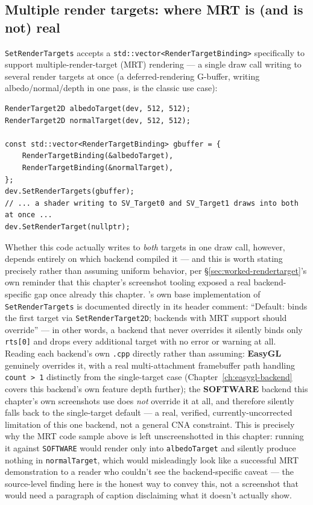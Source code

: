 \subsection{Multiple render targets: where MRT is (and is not) real}
\label{sec:worked-mrt}

\texttt{SetRenderTargets} accepts a \texttt{std::vector<RenderTargetBinding>} specifically to
support multiple-render-target (MRT) rendering --- a single draw call writing to several
render targets at once (a deferred-rendering G-buffer, writing albedo/normal/depth in one
pass, is the classic use case):

\begin{lstlisting}
RenderTarget2D albedoTarget(dev, 512, 512);
RenderTarget2D normalTarget(dev, 512, 512);

const std::vector<RenderTargetBinding> gbuffer = {
    RenderTargetBinding(&albedoTarget),
    RenderTargetBinding(&normalTarget),
};
dev.SetRenderTargets(gbuffer);
// ... a shader writing to SV_Target0 and SV_Target1 draws into both at once ...
dev.SetRenderTarget(nullptr);
\end{lstlisting}

Whether this code actually writes to \emph{both} targets in one draw call, however, depends
entirely on which backend compiled it --- and this is worth stating precisely rather than
assuming uniform behavior, per \S\ref{sec:worked-rendertarget}'s own reminder that this
chapter's screenshot tooling exposed a real backend-specific gap once already this chapter.
's own base implementation of \texttt{SetRenderTargets} is
documented directly in its header comment: ``Default: binds the first target via
\texttt{SetRenderTarget2D}; backends with MRT support should override'' --- in other words,
a backend that never overrides it silently binds only \texttt{rts[0]} and drops every
additional target with no error or warning at all. Reading each backend's own
\texttt{.cpp} directly rather than assuming: \textbf{EasyGL} genuinely overrides it, with a
real multi-attachment framebuffer path handling \texttt{count > 1} distinctly from the
single-target case (Chapter~\ref{ch:easygl-backend} covers this backend's own feature depth
further); the \textbf{SOFTWARE} backend this chapter's own screenshots use does
\emph{not} override it at all, and therefore silently falls back to the single-target default
--- a real, verified, currently-uncorrected limitation of this one backend, not a general CNA
constraint. This is precisely why the MRT code sample above is left unscreenshotted in this
chapter: running it against \texttt{SOFTWARE} would render only into \texttt{albedoTarget} and
silently produce nothing in \texttt{normalTarget}, which would misleadingly look like a
successful MRT demonstration to a reader who couldn't see the backend-specific caveat --- the
source-level finding here is the honest way to convey this, not a screenshot that would need a
paragraph of caption disclaiming what it doesn't actually show.

